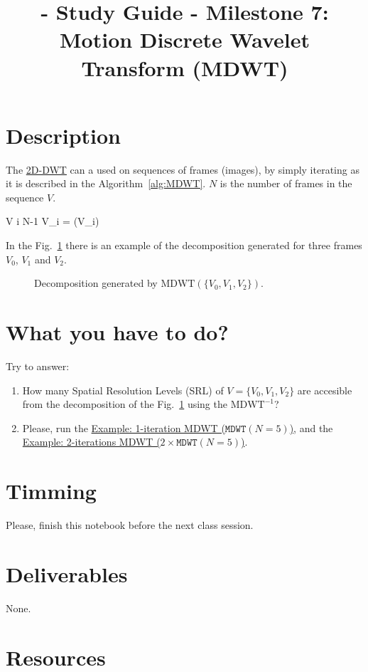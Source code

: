 
\title{\SM{} - Study Guide - Milestone 7: Motion Discrete Wavelet Transform (MDWT)}

\maketitle

\section{Description}

The
\href{https://sistemas-multimedia.github.io/study_guide/06-2D-DWT/}{2D-DWT}
can a used on sequences of frames (images), by simply iterating as it
is described in the Algorithm~\ref{alg:MDWT}. $N$ is the number of
frames in the sequence $V$.

\begin{pseudocode}{}{V}
  \label{alg:MDWT}
  \FOR i  \TO N-1 \DO
  V_i = (V_i)
\end{pseudocode}

In the Fig.~\ref{fig:MDWT} there is an example of the decomposition
generated for three frames $V_0$, $V_1$ and $V_2$.

\begin{figure}
  \centering
  \caption{Decomposition generated by $\text{MDWT}(\{V_0, V_1, V_2\})$.}
  \label{fig:MDWT}
\end{figure}

\section{What you have to do?}

Try to answer:
\begin{enumerate}
\item How many Spatial Resolution Levels (SRL) of
  $V=\{V_0, V_1, V_2\}$ are accesible from the decomposition of the
  Fig.~\ref{fig:MDWT} using the $\text{MDWT}^{-1}$?
\item Please, run the
  \href{https://sistemas-multimedia.github.io/MRVC/#x1-80004.1}{Example:
    1-iteration MDWT ($\mathtt{MDWT}(N=5)$)}, and the
  \href{https://sistemas-multimedia.github.io/MRVC/#x1-90004.2}{Example:
    2-iterations MDWT ($2\times\mathtt{MDWT}(N=5)$)}.
\end{enumerate}

\section{Timming}

Please, finish this notebook before the next class session.

\section{Deliverables}

None.

\section{Resources}


